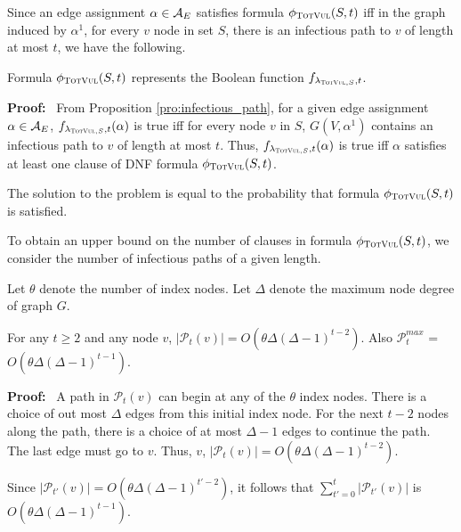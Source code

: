 Since an edge assignment $\alpha \in {\cal A}_E$ satisfies formula $\phi_{\textsc{TotVul}}(S,t)$ 
iff in the graph induced by $\alpha^1$, for every $v$ node in set $S$,
there is an infectious path to $v$ of length at most $t$, we have the following.

 \begin{proposition}\label{pro:formula_TotVul_correct}
 Formula $\phi_{\textsc{TotVul}}(S,t)$ represents the Boolean function 
 $f_{\lambda_{\textsc{TotVul},S},t}$.
 \end{proposition}
 \noindent
\textbf{Proof:}~
From Proposition \ref{pro:infectious_path},
for a given edge assignment $\alpha \in {\cal A}_E$, 
$f_{\lambda_{\textsc{TotVul},S},t}(\alpha)$ is true iff for every node $v$ in $S$,
$G(V, \alpha^1)$ contains an infectious path to $v$ of length at most $t$.
Thus, $f_{\lambda_{\textsc{TotVul},S},t}(\alpha)$ is true iff 
$\alpha$ satisfies at least one clause of DNF formula
$\phi_{\textsc{TotVul}}(S,t)$. 
\QED

\begin{corollary}\label{cor:formula_satprob_TotVul}
 The solution to the \tTotVuls{} problem is equal to
 the probability that formula $\phi_{\textsc{TotVul}}(S,t)$ is satisfied.
\end{corollary}
 
 To obtain an upper bound on the number of clauses in formula $\phi_{\textsc{TotVul}}(S,t)$,
 we consider the number of infectious paths of a given length.
 
 Let $\theta$ denote the number of index nodes. 
 Let $\Delta$ denote the maximum node degree of graph $G$.
 
 \begin{lemma}\label{lem:path_count_t}
 For any $t \geq 2$ and any node $v$, $|\mathcal{P}_t(v)| = O(\theta \Delta (\Delta-1)^{t-2})$.
 Also  $\mathcal{P}_t^{max}$ = \\ $O(\theta \Delta (\Delta-1)^{t-1})$.
 \end{lemma}
 \noindent
\textbf{Proof:}~
A path in $\mathcal{P}_t(v)$ can begin at any of the $\theta$ index nodes.
There is a choice of out most $\Delta$ edges from this initial index node.
For the next $t-2$ nodes along the path,
there is a choice of at most $\Delta-1$ edges to continue the path.
The last edge must go to $v$.
Thus, $v$, $|\mathcal{P}_t(v)| = O(\theta \Delta (\Delta-1)^{t-2})$.

Since $|\mathcal{P}_{t'}(v)| = O(\theta \Delta (\Delta-1)^{t'-2})$,
it follows that $\sum_{t' = 0}^t   |\mathcal{P}_{t'}(v)|$ is 
$O( \theta \Delta (\Delta-1)^{t-1} )$.
\QED

